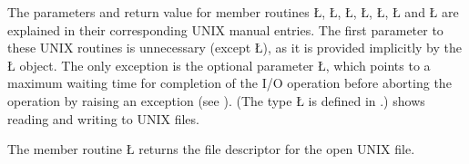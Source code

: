 \documentclass[openright,twoside]{report}
\begin{document}
The parameters and return value for member routines \LGinlinetrue\LGbegin\lgrinde\L{}\endlgrinde\LGend{}, \LGinlinetrue\LGbegin\lgrinde\L{}\endlgrinde\LGend{}, \LGinlinetrue\LGbegin\lgrinde\L{}\endlgrinde\LGend{}, \LGinlinetrue\LGbegin\lgrinde\L{}\endlgrinde\LGend{}, \LGinlinetrue\LGbegin\lgrinde\L{}\endlgrinde\LGend{}, \LGinlinetrue\LGbegin\lgrinde\L{}\endlgrinde\LGend{} and \LGinlinetrue\LGbegin\lgrinde\L{}\endlgrinde\LGend{} are explained in their corresponding UNIX manual entries.
The first parameter to these UNIX routines is unnecessary (except \LGinlinetrue\LGbegin\lgrinde\L{}\endlgrinde\LGend{}), as it is provided implicitly by the \LGinlinetrue\LGbegin\lgrinde\L{}\endlgrinde\LGend{} object.
The only exception is the optional parameter \LGinlinetrue\LGbegin\lgrinde\L{}\endlgrinde\LGend{}, which points to a maximum waiting time for completion of the I/O operation before aborting the operation by raising an exception (see ).
(The type \LGinlinetrue\LGbegin\lgrinde\L{}\endlgrinde\LGend{} is defined in .)
 shows reading and writing to UNIX files.

The member routine \LGinlinetrue\LGbegin\lgrinde\L{}\endlgrinde\LGend{} returns the file descriptor for the open UNIX file.
\end{document}
